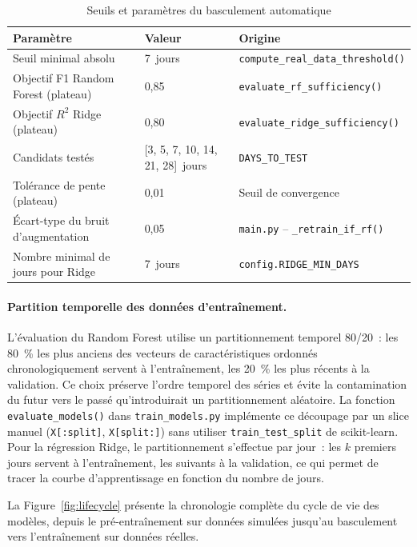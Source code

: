 \begin{table}[htbp]
\centering
\renewcommand{\arraystretch}{1.45}
\caption{Seuils et paramètres du basculement automatique}
\label{tab:basculement}
\begin{tabular}{|p{}|p{}|p{}|}
\hline
\rowcolor{gray!25}
\textbf{Paramètre} & \textbf{Valeur} & \textbf{Origine} \\
\hline
Seuil minimal absolu & 7~jours & \texttt{compute\_real\_data\_threshold()} \\
\hline
Objectif F1 Random Forest (plateau) & 0,85 & \texttt{evaluate\_rf\_sufficiency()} \\
\hline
Objectif \(R^2\) Ridge (plateau) & 0,80 & \texttt{evaluate\_ridge\_sufficiency()} \\
\hline
Candidats testés & [3, 5, 7, 10, 14, 21, 28]~jours & \texttt{DAYS\_TO\_TEST} \\
\hline
Tolérance de pente (plateau) & 0,01 & Seuil de convergence \\
\hline
Écart-type du bruit d'augmentation & 0,05 & \texttt{main.py} -- \texttt{\_retrain\_if\_rf()} \\
\hline
Nombre minimal de jours pour Ridge & 7~jours & \texttt{config.RIDGE\_MIN\_DAYS} \\
\hline
\end{tabular}
\end{table}

\paragraph{Partition temporelle des données d'entraînement.}
L'évaluation du Random Forest utilise un partitionnement temporel 80/20~: les 80~\% les plus anciens des vecteurs de caractéristiques ordonnés chronologiquement servent à l'entraînement, les 20~\% les plus récents à la validation. Ce choix préserve l'ordre temporel des séries et évite la contamination du futur vers le passé qu'introduirait un partitionnement aléatoire. La fonction \texttt{evaluate\_models()} dans \texttt{train\_models.py} implémente ce découpage par un slice manuel (\texttt{X[:split]}, \texttt{X[split:]}) sans utiliser \texttt{train\_test\_split} de scikit-learn. Pour la régression Ridge, le partitionnement s'effectue par jour~: les \(k\) premiers jours servent à l'entraînement, les suivants à la validation, ce qui permet de tracer la courbe d'apprentissage en fonction du nombre de jours.

La Figure~\ref{fig:lifecycle} présente la chronologie complète du cycle de vie des modèles, depuis le pré-entraînement sur données simulées jusqu'au basculement vers l'entraînement sur données réelles.


